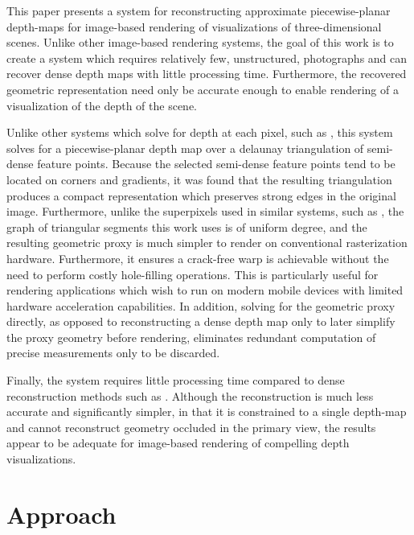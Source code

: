 \documentclass[conference]{acmsiggraph}
\begin{document}
This paper presents a system for reconstructing approximate
piecewise-planar depth-maps for image-based rendering of visualizations
of three-dimensional scenes.  Unlike other image-based rendering systems,
the goal of this work is to create a system which requires relatively few,
unstructured, photographs and can recover dense depth maps with little
processing time.  Furthermore, the recovered geometric representation need
only be accurate enough to enable rendering of a visualization of the depth
of the scene.

Unlike other systems which solve for depth at each pixel,
such as \cite{stuhmer2010real}, this system solves
for a piecewise-planar depth map over a delaunay triangulation
of semi-dense feature points.  Because the selected
semi-dense feature points tend to be located on corners
and gradients, it was found that the resulting triangulation
produces a compact representation which preserves strong
edges in the original image.  Furthermore, unlike the superpixels
used in similar systems, such as \cite{chaurasia2013depth},
the graph of triangular segments this work uses is of uniform degree,
and the resulting geometric proxy is much simpler to render on conventional
rasterization hardware. Furthermore, it ensures a crack-free warp is
achievable without the need to perform costly hole-filling operations.
This is particularly useful for rendering applications which wish to
run on modern mobile devices with limited hardware acceleration capabilities.
In addition, solving for the geometric proxy directly, as opposed to 
reconstructing a dense depth map only to later simplify the proxy geometry
before rendering, eliminates redundant computation of precise measurements
only to be discarded.

Finally, the system requires little processing time compared
to dense reconstruction methods such as \cite{furukawa2010accurate}.
Although the reconstruction is much less accurate and significantly simpler,
in that it is constrained to a single depth-map and cannot reconstruct
geometry occluded in the primary view,
the results appear to be adequate for image-based rendering of compelling depth
visualizations.

\section{Approach}
\end{document}
